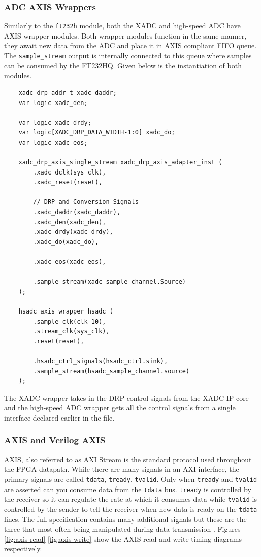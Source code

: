 \documentclass[letterpaper,11pt]{article}
\newcommand{\code}[1]{\texttt{#1}}
\begin{document}
\subsubsection{ADC AXIS Wrappers}
Similarly to the \code{ft232h} module, both the XADC and high-speed ADC have
AXIS wrapper modules. Both wrapper modules function in the same manner, they
await new data from the ADC and place it in AXIS compliant FIFO queue. The
\code{sample_stream} output is internally connected to this queue where samples
can be consumed by the FT232HQ. Given below is the instantiation of both
modules.
\begin{verbatim}
    xadc_drp_addr_t xadc_daddr;
    var logic xadc_den;

    var logic xadc_drdy;
    var logic[XADC_DRP_DATA_WIDTH-1:0] xadc_do;
    var logic xadc_eos;

    xadc_drp_axis_single_stream xadc_drp_axis_adapter_inst (
        .xadc_dclk(sys_clk),
        .xadc_reset(reset),

        // DRP and Conversion Signals
        .xadc_daddr(xadc_daddr),
        .xadc_den(xadc_den),
        .xadc_drdy(xadc_drdy),
        .xadc_do(xadc_do),

        .xadc_eos(xadc_eos),

        .sample_stream(xadc_sample_channel.Source)
    );

    hsadc_axis_wrapper hsadc (
        .sample_clk(clk_10),
        .stream_clk(sys_clk),
        .reset(reset),

        .hsadc_ctrl_signals(hsadc_ctrl.sink),
        .sample_stream(hsadc_sample_channel.source)
    );

\end{verbatim}

The XADC wrapper takes in the DRP control signals from the XADC IP core and the
high-speed ADC wrapper gets all the control signals from a single interface
declared earlier in the file.


\subsubsection{AXIS and Verilog AXIS} \label{sec:external-fpga-libs} AXIS, also
referred to as AXI Stream is the standard protocol used throughout the FPGA
datapath. While there are many signals in an AXI interface, the primary signals
are called \code{tdata}, \code{tready}, \code{tvalid}. Only when \code{tready}
and \code{tvalid} are asserted can you consume data from the \code{tdata} bus.
\code{tready} is controlled by the receiver so it can regulate the rate at which
it consumes data while \code{tvalid} is controlled by the sender to tell the
receiver when new data is ready on the \code{tdata} lines. The full
specification contains many additional signals but these are the three that most
often being manipulated during data transmission \cite{axis_spec}. Figures
\ref{fig:axis-read} \ref{fig:axis-write} show the AXIS read and write timing
diagrams respectively.
\end{document}
